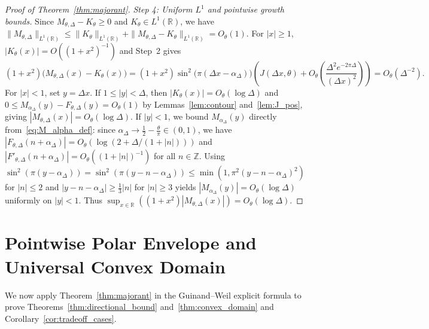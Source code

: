 \documentclass[11pt,a4paper]{amsart}
\theoremstyle{remark}
\numberwithin{equation}{section}
\newcommand{\R}{\mathbb{R}}
\newcommand{\Z}{\mathbb{Z}}
\begin{document}
\begin{proof}[Proof of Theorem~\ref{thm:majorant}]
\emph{Step 4: Uniform $L^1$ and pointwise growth bounds.} Since $M_{\theta,\Delta} - K_\theta \ge 0$ and $K_\theta \in L^1(\R)$, we have $\|M_{\theta,\Delta}\|_{L^1(\R)} \le \|K_\theta\|_{L^1(\R)} + \|M_{\theta,\Delta}-K_\theta\|_{L^1(\R)} = O_\theta(1)$. For $|x| \ge 1$, $|K_\theta(x)| = O((1+x^2)^{-1})$ and Step~2 gives
\[
  (1+x^2)\bigl(M_{\theta,\Delta}(x) - K_\theta(x)\bigr) = (1+x^2)\sin^2\bigl(\pi(\Delta x - \alpha_\Delta)\bigr)\left(J(\Delta x,\theta) + O_\theta\!\left(\frac{\Delta^2 e^{-2\pi\Delta}}{(\Delta x)^2}\right)\right) = O_\theta(\Delta^{-2}).
\]
For $|x| < 1$, set $y = \Delta x$. If $1 \le |y| < \Delta$, then $|K_\theta(x)| = O_\theta(\log\Delta)$ and $0 \le M_{\alpha_\Delta}(y) - F_{\theta,\Delta}(y) = O_\theta(1)$ by Lemmas~\ref{lem:contour} and~\ref{lem:J_pos}, giving $|M_{\theta,\Delta}(x)| = O_\theta(\log\Delta)$. If $|y| < 1$, we bound $M_{\alpha_\Delta}(y)$ directly from~\eqref{eq:M_alpha_def}: since $\alpha_\Delta \to \frac{1}{2}-\frac{\theta}{\pi} \in (0,1)$, we have $|F_{\theta,\Delta}(n+\alpha_\Delta)| = O_\theta(\log(2+\Delta/(1+|n|)))$ and $|F'_{\theta,\Delta}(n+\alpha_\Delta)| = O_\theta((1+|n|)^{-1})$ for all $n \in \Z$. Using $\sin^2(\pi(y-\alpha_\Delta)) = \sin^2(\pi(y-n-\alpha_\Delta)) \le \min(1, \pi^2(y-n-\alpha_\Delta)^2)$ for $|n| \le 2$ and $|y-n-\alpha_\Delta| \ge \frac{1}{3}|n|$ for $|n| \ge 3$ yields $|M_{\alpha_\Delta}(y)| = O_\theta(\log\Delta)$ uniformly on $|y| < 1$. Thus $\sup_{x\in\R}((1+x^2)|M_{\theta,\Delta}(x)|) = O_\theta(\log\Delta)$.
\end{proof}

\section{Pointwise Polar Envelope and Universal Convex Domain}\label{sec:pointwise}

We now apply Theorem~\ref{thm:majorant} in the Guinand--Weil explicit formula to prove Theorems~\ref{thm:directional_bound} and~\ref{thm:convex_domain} and Corollary~\ref{cor:tradeoff_cases}.
\end{document}
